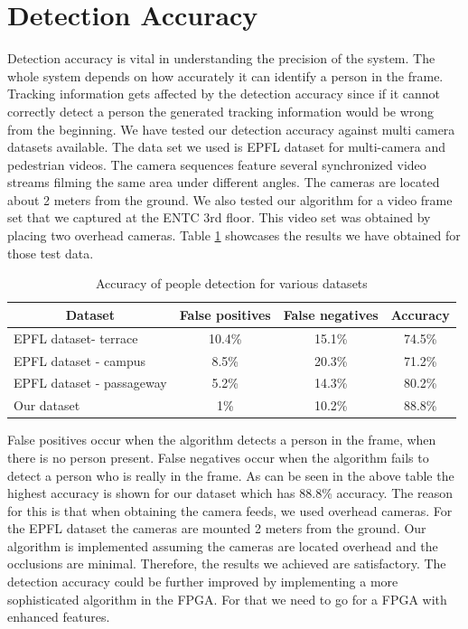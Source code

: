 \documentclass[12pt,a4paper]{report}
\begin{document}
\section{Detection Accuracy}
Detection accuracy is vital in understanding the precision of the system. The whole system depends on how accurately it can identify a person in the frame. Tracking information gets affected by the detection accuracy since if it cannot correctly detect a person the generated tracking information would be wrong from the beginning.
We have tested our detection accuracy against multi camera datasets available. The data set we used is EPFL dataset for multi-camera and pedestrian videos. The camera sequences feature several synchronized video streams filming the same area under different angles. The cameras are located about 2 meters from the ground. We also tested our algorithm for a video frame set that we captured at the ENTC 3rd floor. This video set was obtained by placing two overhead cameras.
Table \ref{accuracy} showcases the results we have obtained for those test data.
\begin{table}[H]
\centering
\caption{Accuracy of people detection for various datasets}
\label{accuracy}
\begin{tabular}{|l|c|c|c|}
\hline
\multicolumn{1}{|c|}{\textbf{Dataset}} & \textbf{False positives} & \textbf{False negatives} & \textbf{Accuracy} \\ \hline
EPFL dataset- terrace                  & 10.4\%                   & 15.1\%                   & 74.5\%            \\ \hline
EPFL dataset - campus                  & 8.5\%                    & 20.3\%                   & 71.2\%            \\ \hline
EPFL dataset - passageway              & 5.2\%                    & 14.3\%                   & 80.2\%            \\ \hline
Our dataset                            & 1\%                      & 10.2\%                   & 88.8\%            \\ \hline
\end{tabular}
\end{table}

False positives occur when the algorithm detects a person in the frame, when there is no person present. False negatives occur when the algorithm fails to detect a person who is really in the frame. 
As can be seen in the above table the highest accuracy is shown for our dataset which has 88.8\% accuracy. The reason for this is that when obtaining the camera feeds, we used overhead cameras. For the EPFL dataset the cameras are mounted 2 meters from the ground. Our algorithm is implemented assuming the cameras are located overhead and the occlusions are minimal. Therefore, the results we achieved are satisfactory. 
The detection accuracy could be further improved by implementing a more sophisticated algorithm in the FPGA. For that we need to go for a FPGA with enhanced features.
\end{document}
